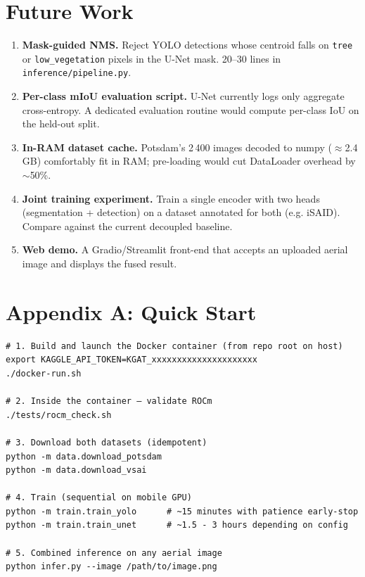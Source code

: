 \documentclass[11pt,a4paper]{article}
\begin{document}
\section{Future Work}

\begin{enumerate}[leftmargin=*]
  \item \textbf{Mask-guided NMS.} Reject YOLO detections whose centroid falls
    on \texttt{tree} or \texttt{low\_vegetation} pixels in the U-Net mask.
    20--30 lines in \texttt{inference/pipeline.py}.
  \item \textbf{Per-class mIoU evaluation script.} U-Net currently logs only
    aggregate cross-entropy. A dedicated evaluation routine would compute
    per-class IoU on the held-out split.
  \item \textbf{In-RAM dataset cache.} Potsdam's 2\,400 images decoded to
    numpy ($\approx$2.4\,GB) comfortably fit in RAM; pre-loading would cut
    DataLoader overhead by $\sim$50\%.
  \item \textbf{Joint training experiment.} Train a single encoder with two heads
    (segmentation + detection) on a dataset annotated for both (e.g. iSAID).
    Compare against the current decoupled baseline.
  \item \textbf{Web demo.} A Gradio/Streamlit front-end that accepts an uploaded
    aerial image and displays the fused result.
\end{enumerate}

\section*{Appendix A: Quick Start}

\begin{lstlisting}[style=bash, caption={End-to-end reproduction.}]
# 1. Build and launch the Docker container (from repo root on host)
export KAGGLE_API_TOKEN=KGAT_xxxxxxxxxxxxxxxxxxxxx
./docker-run.sh

# 2. Inside the container — validate ROCm
./tests/rocm_check.sh

# 3. Download both datasets (idempotent)
python -m data.download_potsdam
python -m data.download_vsai

# 4. Train (sequential on mobile GPU)
python -m train.train_yolo      # ~15 minutes with patience early-stop
python -m train.train_unet      # ~1.5 - 3 hours depending on config

# 5. Combined inference on any aerial image
python infer.py --image /path/to/image.png
\end{lstlisting}
\end{document}
